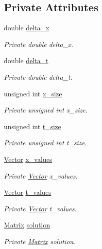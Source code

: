 \subsection*{Private Attributes}
\begin{DoxyCompactItemize}
\item 
double \hyperlink{classProblem_a6d6d5f0aeca78dc62a84f74ab3d609d9}{delta\+\_\+x}
\begin{DoxyCompactList}\small\item\em Private double delta\+\_\+x. \end{DoxyCompactList}\item 
double \hyperlink{classProblem_adb04657b8f456da09cefbcd6328403fe}{delta\+\_\+t}
\begin{DoxyCompactList}\small\item\em Private double delta\+\_\+t. \end{DoxyCompactList}\item 
unsigned int \hyperlink{classProblem_afa87f6f37b1b167eb93b9a7655bcd0cc}{x\+\_\+size}
\begin{DoxyCompactList}\small\item\em Private unsigned int x\+\_\+size. \end{DoxyCompactList}\item 
unsigned int \hyperlink{classProblem_a66936266b7164a2a2f1af01bc9baccb9}{t\+\_\+size}
\begin{DoxyCompactList}\small\item\em Private unsigned int t\+\_\+size. \end{DoxyCompactList}\item 
\hyperlink{classVector}{Vector} \hyperlink{classProblem_a2b451feb5a8d7f3e870e2b5e607f0b7c}{x\+\_\+values}
\begin{DoxyCompactList}\small\item\em Private \hyperlink{classVector}{Vector} x\+\_\+values. \end{DoxyCompactList}\item 
\hyperlink{classVector}{Vector} \hyperlink{classProblem_a8255789b9dc8cabdd933ddbcf4bd49aa}{t\+\_\+values}
\begin{DoxyCompactList}\small\item\em Private \hyperlink{classVector}{Vector} t\+\_\+values. \end{DoxyCompactList}\item 
\hyperlink{classMatrix}{Matrix} \hyperlink{classProblem_a2051ea400371fc901151bd5d2826189c}{solution}
\begin{DoxyCompactList}\small\item\em Private \hyperlink{classMatrix}{Matrix} solution. \end{DoxyCompactList}\end{DoxyCompactItemize}


